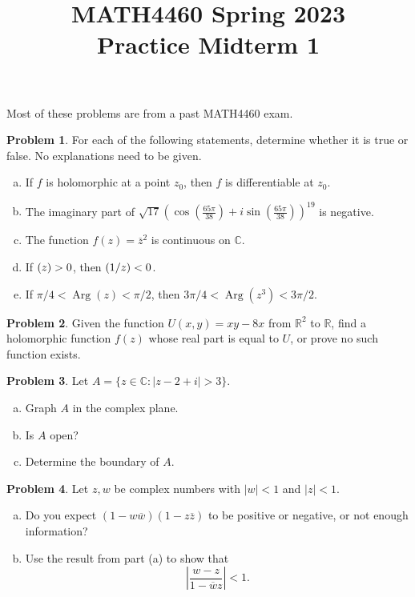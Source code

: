 \documentclass[11pt,oneside]{amsart}
\title{MATH4460 Spring 2023\\
Practice Midterm 1}
\theoremstyle{definition}
\newtheorem{problem}{Problem}
\newcommand{\bC}{\mathbb{C}}
\newcommand{\bR}{\mathbb{R}}
\let\Im\relax
\DeclareMathOperator{\Im}{Im}
\DeclareMathOperator{\Arg}{Arg}
\begin{document}
\maketitle

Most of these problems are from a past MATH4460 exam.

\begin{problem}
  For each of the following statements, determine whether it is true or false. No explanations need to be given.
  \begin{enumerate}[(a)]
    \item If $f$ is holomorphic at a point $z_0$, then $f$ is differentiable at $z_0$.
    \item The imaginary part of $\sqrt{17}\left( \cos\left( \frac{65\pi}{38} \right) +i\sin\left( \frac{65\pi}{38} \right)\right)^{19}$ is negative.
    \item The function $f(z)=\overline z^2$ is continuous on $\bC$.
    \item If $\Im(z)>0$, then $\Im(1/z)<0$.
    \item If $\pi/4<\Arg(z)<\pi/2$, then $3\pi/4<\Arg(z^3)<3\pi/2$.
  \end{enumerate}
\end{problem}

\begin{problem}
  Given the function $U(x,y)=xy-8x$ from $\bR^2$ to $\bR$, find a holomorphic function $f(z)$ whose real part is equal to $U$, or prove no such function exists.
\end{problem}

\begin{problem}
  Let $A=\{z\in\bC:|z-2+i|>3\}$.
  \begin{enumerate}[(a)]
    \item Graph $A$ in the complex plane.
    \item Is $A$ open?
    \item Determine the boundary of $A$.
  \end{enumerate}
\end{problem}

\begin{problem}
  Let $z,w$ be complex numbers with $|w|<1$ and $|z|<1$.
  \begin{enumerate}[(a)]
    \item Do you expect $(1-w\overline w)(1-z\overline z)$ to be positive or negative, or not enough information?
    \item Use the result from part (a) to show that
    \[\left|\frac{w-z}{1-\overline wz}\right|<1.\]
  \end{enumerate}
\end{problem}
\end{document}
